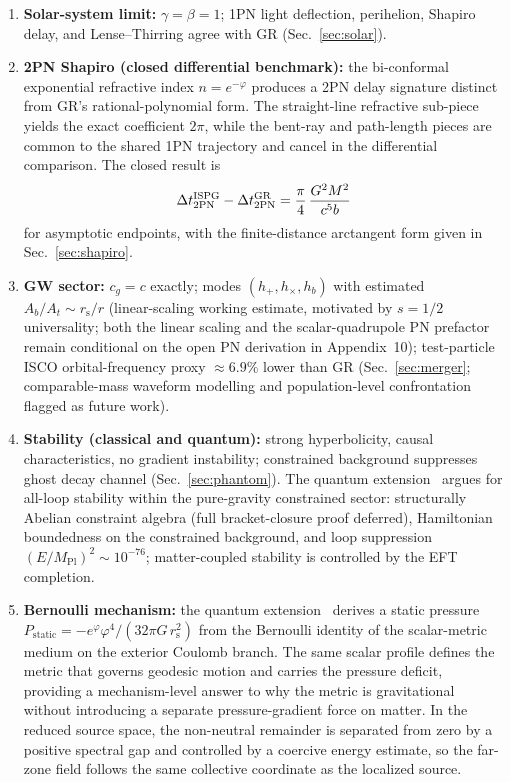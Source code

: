 \documentclass[aps,prd,onecolumn,superscriptaddress,nofootinbib,showpacs,12pt]{revtex4-2}
\newcommand{\Mpl}{M_{\mathrm{Pl}}}
\newcommand{\rs}{r_{\mathrm{s}}}
\begin{document}
\begin{enumerate}
\item \textbf{Solar-system limit:} $\gamma=\beta=1$;
  1PN light deflection, perihelion, Shapiro delay, and
  Lense--Thirring agree with GR (Sec.~\ref{sec:solar}).

\item \textbf{2PN Shapiro (closed differential benchmark):} the bi-conformal
  exponential refractive index $n=e^{-\varphi}$ produces a
  2PN delay signature distinct from GR's rational-polynomial
  form.  The straight-line refractive sub-piece yields the exact
  coefficient $2\pi$, while the bent-ray and path-length pieces
  are common to the shared 1PN trajectory and cancel in the
  differential comparison.  The closed result is
  \[
  \Delta t_{2{\rm PN}}^{\rm ISPG}
  -\Delta t_{2{\rm PN}}^{\rm GR}
  =
  \frac{\pi}{4}\,\frac{G^2M^2}{c^5 b}
  \]
  for asymptotic endpoints, with the finite-distance arctangent
  form given in Sec.~\ref{sec:shapiro}.

\item \textbf{GW sector:} $c_g=c$ exactly;
  modes $(h_+,h_\times,h_b)$ with estimated
  $A_b/A_t\sim\rs/r$ (linear-scaling working estimate,
  motivated by $s=1/2$ universality; both the linear
  scaling and the scalar-quadrupole PN prefactor remain
  conditional on the open PN derivation in
  Appendix~10); test-particle ISCO orbital-frequency
  proxy $\approx 6.9\%$ lower than GR
  (Sec.~\ref{sec:merger}; comparable-mass waveform
  modelling and population-level confrontation flagged
  as future work).

\item \textbf{Stability (classical and quantum):} strong
  hyperbolicity, causal characteristics, no gradient
  instability; constrained background suppresses ghost
  decay channel (Sec.~\ref{sec:phantom}).  The quantum
  extension~\cite{Lotishvili2026Q} argues for all-loop
  stability within the pure-gravity constrained sector:
  structurally Abelian constraint algebra (full
  bracket-closure proof deferred), Hamiltonian
  boundedness on the constrained background, and loop
  suppression $(E/\Mpl)^{2} \sim 10^{-76}$;
  matter-coupled stability is controlled by the EFT
  completion.

\item \textbf{Bernoulli mechanism:}
  the quantum extension~\cite{Lotishvili2026Q} derives
  a static pressure
  $P_{\mathrm{static}} =
  -e^{\varphi}\varphi^{4}/(32\pi G\,\rs^{2})$
  from the Bernoulli identity of the scalar-metric
  medium on the exterior Coulomb branch.  The same scalar
  profile defines the metric that governs geodesic motion
  and carries the pressure deficit, providing a
  mechanism-level answer to why the metric is
  gravitational without introducing a separate
  pressure-gradient force on matter.  In the reduced source space,
  the non-neutral remainder is separated from zero by a
  positive spectral gap and controlled by a coercive
  energy estimate, so the far-zone field follows the
  same collective coordinate as the localized source.


\end{enumerate}
\end{document}
